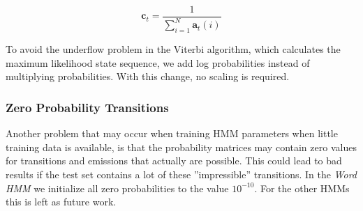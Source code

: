 \begin{equation}\label{eq:rabiner-scaling}
\textbf{c}_t = \frac{1}{ \displaystyle\sum_{i=1}^N \textbf{a}_t(i)}
\end{equation}

To avoid the underflow problem in the Viterbi algorithm, which calculates the maximum likelihood state sequence, we add log probabilities instead of multiplying probabilities.
With this change, no scaling is required.

\subsubsection{Zero Probability Transitions}
Another problem that may occur when training HMM parameters when little training data is available, is that the probability matrices may contain zero values for transitions and emissions that actually are possible.
This could lead to bad results if the test set contains a lot of these ''impressible'' transitions.
In the \textit{Word HMM} we initialize all zero probabilities to the value \textbf{ $10^{-10}$}.
For the other HMMs this is left as future work.